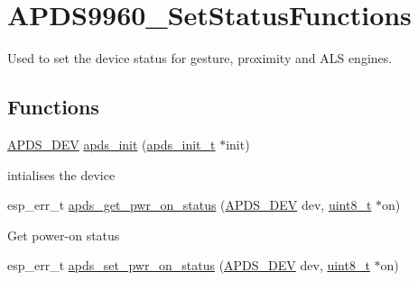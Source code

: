 \hypertarget{group__APDS9960__SetStatusFunctions}{}\section{A\+P\+D\+S9960\+\_\+\+Set\+Status\+Functions}
\label{group__APDS9960__SetStatusFunctions}


Used to set the device status for gesture, proximity and A\+LS engines.  


\subsection*{Functions}
\begin{DoxyCompactItemize}
\item 
\hyperlink{structAPDS9960__Driver}{A\+P\+D\+S\+\_\+\+D\+EV} \hyperlink{group__APDS9960__SetStatusFunctions_gae521c555a0b8eafc0a33f171582d0447}{apds\+\_\+init} (\hyperlink{structapds__init__t}{apds\+\_\+init\+\_\+t} $\ast$init)
\begin{DoxyCompactList}\small\item\em 
\begin{DoxyItemize}
\item intialises the device 
\end{DoxyItemize}\end{DoxyCompactList}\item 
esp\+\_\+err\+\_\+t \hyperlink{group__APDS9960__SetStatusFunctions_gaebd3fa7ba4aa12ccc0bba6cb55cf3062}{apds\+\_\+get\+\_\+pwr\+\_\+on\+\_\+status} (\hyperlink{structAPDS9960__Driver}{A\+P\+D\+S\+\_\+\+D\+EV} dev, \hyperlink{vl53l0x__types_8h_aba7bc1797add20fe3efdf37ced1182c5}{uint8\+\_\+t} $\ast$on)
\begin{DoxyCompactList}\small\item\em 
\begin{DoxyItemize}
\item Get power-\/on status 
\end{DoxyItemize}\end{DoxyCompactList}\item 
esp\+\_\+err\+\_\+t \hyperlink{group__APDS9960__SetStatusFunctions_gaea326b5abc9dca7faad2a137423bac3e}{apds\+\_\+set\+\_\+pwr\+\_\+on\+\_\+status} (\hyperlink{structAPDS9960__Driver}{A\+P\+D\+S\+\_\+\+D\+EV} dev, \hyperlink{vl53l0x__types_8h_aba7bc1797add20fe3efdf37ced1182c5}{uint8\+\_\+t} $\ast$on)
\begin{DoxyCompactList}\small\item\em 

\end{DoxyCompactList}
\end{DoxyCompactItemize}
